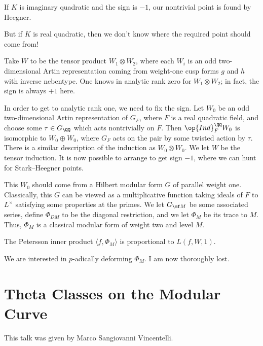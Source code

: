 \documentclass{article}
\begin{document}
\begin{example}
	If $K$ is imaginary quadratic and the sign is $-1$, our nontrivial point is found by Heegner.
\end{example}
But if $K$ is real quadratic, then we don't know where the required point should come from!
\begin{example}
	Take $W$ to be the tensor product $W_1\otimes W_2$, where each $W_i$ is an odd two-dimensional Artin representation coming from weight-one cusp forms $g$ and $h$ with inverse nebentype. One knows  in analytic rank zero for $W_1\otimes W_2$; in fact, the sign is always $+1$ here.
\end{example}
In order to get to analytic rank one, we need to fix the sign. Let $W_0$ be an odd two-dimensional Artin representation of $G_F$, where $F$ is a real quadratic field, and choose some $\tau\in G_\QQ$ which acts nontrivially on $F$. Then $\op{Ind}_F^\QQ W_0$ is isomorphic to $W_0\oplus W_0$, where $G_F$ acts on the pair by some twisted action by $\tau$. There is a similar description of the induction as $W_0\otimes W_0$. We let $W$ be the tensor induction. It is now possible to arrange to get sign $-1$, where we can hunt for Stark--Heegner points.

This $W_0$ should come from a Hilbert modular form $G$ of parallel weight one. Classically, this $G$ can be viewed as a multiplicative function taking ideals of $F$ to $L^\times$ satisfying some properties at the primes. We let $G_{\mf M}$ be some associated series, define $\Phi_{DM}$ to be the diagonal restriction, and we let $\Phi_M$ be its trace to $M$. Thus, $\Phi_M$ is a classical modular form of weight two and level $M$.
\begin{theorem}
	The Petersson inner product $\langle f,\Phi_M\rangle$ is proportional to $L(f,W,1)$.
\end{theorem}
We are interested in $p$-adically deforming $\Phi_M$. I am now thoroughly lost.

\section{Theta Classes on the Modular Curve}
This talk was given by Marco Sangiovanni Vincentelli.
\end{document}
